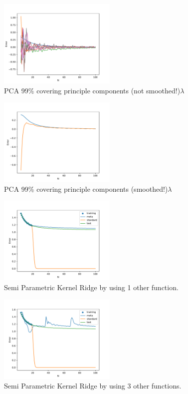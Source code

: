 \documentclass{tran-l}
\theoremstyle{definition}
\theoremstyle{remark}
\numberwithin{equation}{section}
\begin{document}
\begin{figure}[h!]
   \centering
   \includegraphics[width=0.5\textwidth]{Figures/initial_study/lc_pca.pdf}
   \caption{PCA 99\% covering principle components (not smoothed!)$\lambda$}
\end{figure}

\begin{figure}[h!]
   \centering
   \includegraphics[width=0.5\textwidth]{Figures/initial_study/smooth_pca.pdf}
   \caption{PCA 99\% covering principle components (smoothed!)$\lambda$}
\end{figure}

\begin{figure}[h!]
   \centering
   \includegraphics[width=0.5\textwidth]{Figures/initial_study/lc_pred_funcs_1.pdf}
   \caption{Semi Parametric Kernel Ridge by using 1 other function. }
\end{figure}

\begin{figure}[h!]
   \centering
   \includegraphics[width=0.5\textwidth]{Figures/initial_study/lc_funcs_3.pdf}
   \caption{Semi Parametric Kernel Ridge by using 3 other functions. }
\end{figure}
\end{document}

